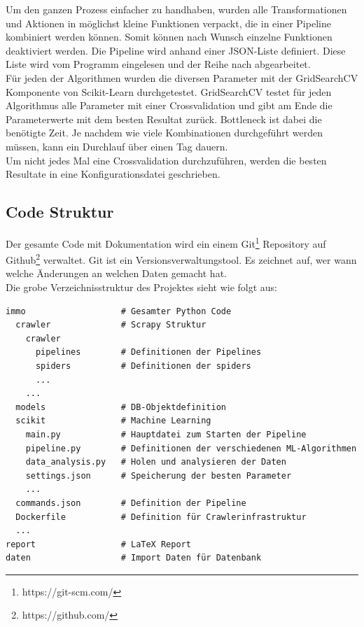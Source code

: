 Um den ganzen Prozess einfacher zu handhaben, wurden alle Transformationen und Aktionen in möglichst kleine Funktionen verpackt, die in einer Pipeline kombiniert werden können. Somit können nach Wunsch einzelne Funktionen deaktiviert werden. Die Pipeline wird anhand einer JSON-Liste definiert. Diese Liste wird vom Programm eingelesen und der Reihe nach abgearbeitet.\\[2ex]
%
Für jeden der Algorithmen wurden die diversen Parameter mit der GridSearchCV Komponente von Scikit-Learn durchgetestet. GridSearchCV testet für jeden Algorithmus alle Parameter mit einer Crossvalidation und gibt am Ende die Parameterwerte mit dem besten Resultat zurück. Bottleneck ist dabei die benötigte Zeit. Je nachdem wie viele Kombinationen durchgeführt werden müssen, kann ein Durchlauf über einen Tag dauern.\\
Um nicht jedes Mal eine Crossvalidation durchzuführen, werden die besten Resultate in eine Konfigurationsdatei geschrieben.

\subsection{Code Struktur}
Der gesamte Code mit Dokumentation wird ein einem Git\footnote{https://git-scm.com/} Repository auf Github\footnote{https://github.com/} verwaltet. Git ist ein Versionsverwaltungstool. Es zeichnet auf, wer wann welche Änderungen an welchen Daten gemacht hat.\\
Die grobe Verzeichnisstruktur des Projektes sieht wie folgt aus:
\begin{verbatim}
immo                   # Gesamter Python Code
  crawler              # Scrapy Struktur
    crawler
      pipelines        # Definitionen der Pipelines
      spiders          # Definitionen der spiders
      ...
    ...
  models               # DB-Objektdefinition
  scikit               # Machine Learning
    main.py            # Hauptdatei zum Starten der Pipeline
    pipeline.py        # Definitionen der verschiedenen ML-Algorithmen
    data_analysis.py   # Holen und analysieren der Daten
    settings.json      # Speicherung der besten Parameter
    ...
  commands.json        # Definition der Pipeline
  Dockerfile           # Definition für Crawlerinfrastruktur
  ...
report                 # LaTeX Report
daten                  # Import Daten für Datenbank
\end{verbatim}

